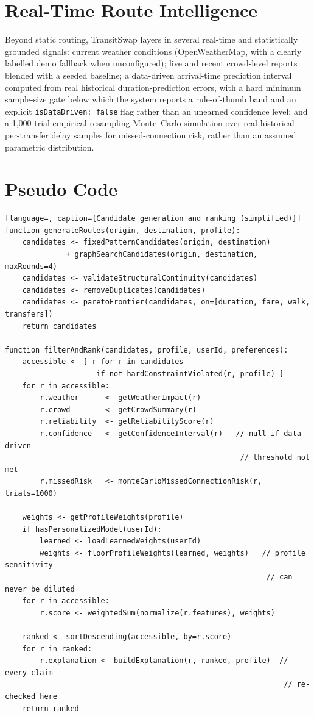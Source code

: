 \documentclass[12pt,a4paper]{report}
\begin{document}
\section{Real-Time Route Intelligence}

Beyond static routing, TransitSwap layers in several real-time and statistically grounded signals:
current weather conditions (OpenWeatherMap, with a clearly labelled demo fallback when unconfigured);
live and recent crowd-level reports blended with a seeded baseline; a data-driven arrival-time
prediction interval computed from real historical duration-prediction errors, with a hard minimum
sample-size gate below which the system reports a rule-of-thumb band and an explicit
\texttt{isDataDriven: false} flag rather than an unearned confidence level; and a 1{,}000-trial
empirical-resampling Monte~Carlo simulation over real historical per-transfer delay samples for
missed-connection risk, rather than an assumed parametric distribution.

\section{Pseudo Code}

\begin{lstlisting}[language=, caption={Candidate generation and ranking (simplified)}]
function generateRoutes(origin, destination, profile):
    candidates <- fixedPatternCandidates(origin, destination)
              + graphSearchCandidates(origin, destination, maxRounds=4)
    candidates <- validateStructuralContinuity(candidates)
    candidates <- removeDuplicates(candidates)
    candidates <- paretoFrontier(candidates, on=[duration, fare, walk, transfers])
    return candidates

function filterAndRank(candidates, profile, userId, preferences):
    accessible <- [ r for r in candidates
                     if not hardConstraintViolated(r, profile) ]
    for r in accessible:
        r.weather      <- getWeatherImpact(r)
        r.crowd        <- getCrowdSummary(r)
        r.reliability  <- getReliabilityScore(r)
        r.confidence   <- getConfidenceInterval(r)   // null if data-driven
                                                      // threshold not met
        r.missedRisk   <- monteCarloMissedConnectionRisk(r, trials=1000)

    weights <- getProfileWeights(profile)
    if hasPersonalizedModel(userId):
        learned <- loadLearnedWeights(userId)
        weights <- floorProfileWeights(learned, weights)   // profile sensitivity
                                                            // can never be diluted
    for r in accessible:
        r.score <- weightedSum(normalize(r.features), weights)

    ranked <- sortDescending(accessible, by=r.score)
    for r in ranked:
        r.explanation <- buildExplanation(r, ranked, profile)  // every claim
                                                                // re-checked here
    return ranked
\end{lstlisting}
\end{document}
